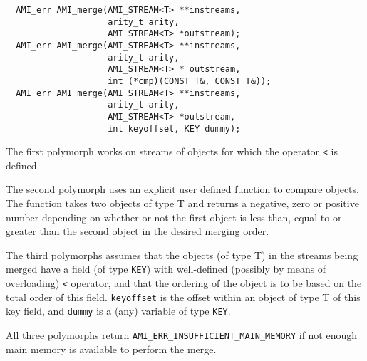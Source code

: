 \begin{verbatim}
  AMI_err AMI_merge(AMI_STREAM<T> **instreams,
                    arity_t arity, 
                    AMI_STREAM<T> *outstream);
  AMI_err AMI_merge(AMI_STREAM<T> **instreams,
                    arity_t arity,
                    AMI_STREAM<T> * outstream,
                    int (*cmp)(CONST T&, CONST T&));
  AMI_err AMI_merge(AMI_STREAM<T> **instreams,
                    arity_t arity,
                    AMI_STREAM<T> *outstream,
                    int keyoffset, KEY dummy);
\end{verbatim}


The first polymorph works on streams of objects for which the operator
\verb|<| is defined.

The second polymorph uses an explicit user defined function to compare
objects. The function takes two objects of type T and returns a negative,
zero or positive number depending on whether or not the first object is
less than, equal to or greater than the second object in the desired
merging order.

The third polymorphs assumes that the objects (of type T) in the streams
being merged have a field (of type \verb|KEY|) with well-defined (possibly
by means of overloading) \verb|<| operator, and that the ordering of the
object is to be based on the total order of this field. \verb|keyoffset| is
the offset within an object of type T of this key field, and \verb|dummy| is
a (any) variable of type \verb|KEY|.

All three polymorphs return \verb|AMI_ERR_INSUFFICIENT_MAIN_MEMORY| if not
enough main memory is available to perform the merge.



